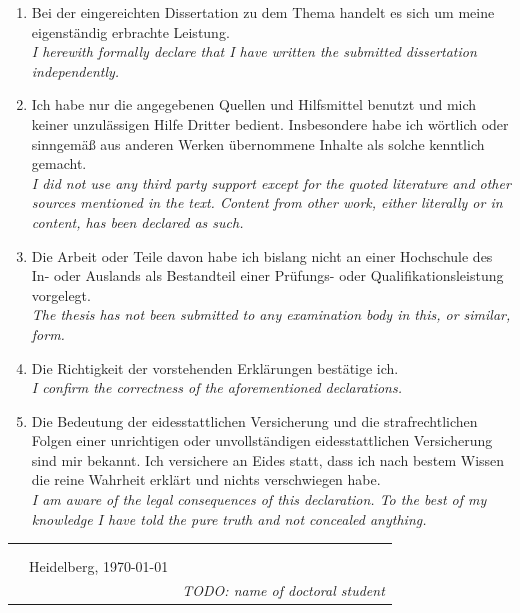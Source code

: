     \begin{enumerate}
        \setlength{\itemsep}{0pt}
        \item Bei der eingereichten Dissertation zu dem Thema \emph{\textbf{\thesistitle}} handelt es sich um meine eigenständig erbrachte Leistung.\\
        \emph{\small\color{dkfzgray2} I herewith formally declare that I have written the submitted dissertation \textbf{\thesistitle} independently.}
        
        \item Ich habe nur die angegebenen Quellen und Hilfsmittel benutzt und mich keiner unzulässigen Hilfe Dritter bedient. Insbesondere habe ich wörtlich oder sinngemäß aus anderen Werken übernommene Inhalte als solche kenntlich gemacht.\\
        \emph{\small\color{dkfzgray2}  I did not use any third party support except for the quoted literature and other sources mentioned in the text. Content from other work, either literally or in content, has been declared as such.}
        
        \item Die Arbeit oder Teile davon habe ich bislang nicht an einer Hochschule des In- oder Auslands als Bestandteil einer Prüfungs- oder Qualifikationsleistung vorgelegt.\\
        \emph{\small\color{dkfzgray2} The thesis has not been submitted to any examination body in this, or similar, form. }
        
        \item Die Richtigkeit der vorstehenden Erklärungen bestätige ich.\\
        \emph{\small\color{dkfzgray2} I confirm the correctness of the aforementioned declarations.}
        
        \item Die Bedeutung der eidesstattlichen Versicherung und die strafrechtlichen Folgen einer unrichtigen oder unvollständigen eidesstattlichen Versicherung sind mir bekannt. Ich versichere an Eides statt, dass ich nach bestem Wissen die reine Wahrheit erklärt und nichts verschwiegen habe.\\
        \emph{\small\color{dkfzgray2} I am aware of the legal consequences of this declaration. To the best of my knowledge I have told the pure truth and not concealed anything.}
    \end{enumerate}
    
    \begin{tabular}{p{3cm}p{5cm}p{4cm}}
          &  & \\
          & & \\
          &Heidelberg, \today & \hrulefill\\
          & & \textit{TODO: name of doctoral student}
    \end{tabular}
